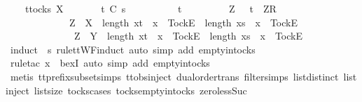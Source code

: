 \ \ \ \ {\isacharparenleft}{\isasymexists}t{\isasymin}tocks\ X{\isachardot}\isanewline
\ \ \ \ \ \ \ t\ {\isasymlesssim}\isactrlsub C\ s\ {\isasymand}\isanewline
\ \ \ \ \ \ \ {\isacharparenleft}{\isasymrho}\ {\isacharequal}\ t\ {\isasymor}\isanewline
\ \ \ \ \ \ \ \ {\isacharparenleft}{\isasymexists}Z{\isachardot}\ {\isasymrho}\ {\isacharequal}\ t\ {\isacharat}\ {\isacharbrackleft}{\isacharbrackleft}Z{\isacharbrackright}\isactrlsub R{\isacharbrackright}\ {\isasymand}\isanewline
\ \ \ \ \ \ \ \ \ \ \ \ \ {\isacharparenleft}Z\ {\isasymsubseteq}\ X\ {\isasymand}\ length\ {\isacharbrackleft}x{\isasymleftarrow}t\ {\isachardot}\ x\ {\isacharequal}\ {\isacharbrackleft}Tock{\isacharbrackright}\isactrlsub E{\isacharbrackright}\ {\isacharless}\ length\ {\isacharbrackleft}x{\isasymleftarrow}s\ {\isachardot}\ x\ {\isacharequal}\ {\isacharbrackleft}Tock{\isacharbrackright}\isactrlsub E{\isacharbrackright}\ {\isasymor}\isanewline
\ \ \ \ \ \ \ \ \ \ \ \ \ \ Z\ {\isasymsubseteq}\ Y\ {\isasymand}\ length\ {\isacharbrackleft}x{\isasymleftarrow}t\ {\isachardot}\ x\ {\isacharequal}\ {\isacharbrackleft}Tock{\isacharbrackright}\isactrlsub E{\isacharbrackright}\ {\isacharequal}\ length\ {\isacharbrackleft}x{\isasymleftarrow}s\ {\isachardot}\ x\ {\isacharequal}\ {\isacharbrackleft}Tock{\isacharbrackright}\isactrlsub E{\isacharbrackright}{\isacharparenright}{\isacharparenright}{\isacharparenright}{\isacharparenright}{\isachardoublequoteclose}\isanewline
\ \ \ \ \isamarkupfalse%
\ {\isacharparenleft}induct\ {\isasymrho}\ s\ rule{\isacharcolon}ttWF{}{\isachardot}induct{\isacharcomma}\ auto\ simp\ add{\isacharcolon}\ empty{\isacharunderscore}in{\isacharunderscore}tocks{\isacharparenright}\isanewline
\ \ \ \ \isamarkupfalse%
\ {\isacharparenleft}rule{\isacharunderscore}tac\ x{\isacharequal}{\isachardoublequoteopen}{\isacharbrackleft}{\isacharbrackright}{\isachardoublequoteclose}\ \ bexI{\isacharcomma}\ auto\ simp\ add{\isacharcolon}\ empty{\isacharunderscore}in{\isacharunderscore}tocks{\isacharparenright}\isanewline
\ \ \ \ \isamarkupfalse%
\ {\isacharparenleft}metis\ tt{\isacharunderscore}prefix{\isacharunderscore}subset{\isachardot}simps{\isacharparenleft}{}{\isacharparenright}\ ttobs{\isachardot}inject{\isacharparenleft}{}{\isacharparenright}\ dual{\isacharunderscore}order{\isachardot}trans\ filter{\isachardot}simps{\isacharparenleft}{}{\isacharparenright}\ list{\isachardot}distinct{\isacharparenleft}{}{\isacharparenright}\ list{\isachardot}inject\ list{\isachardot}size{\isacharparenleft}{}{\isacharparenright}\ tocks{\isachardot}cases\ tocks{\isachardot}empty{\isacharunderscore}in{\isacharunderscore}tocks\ zero{\isacharunderscore}less{\isacharunderscore}Suc{\isacharparenright}\isanewline
